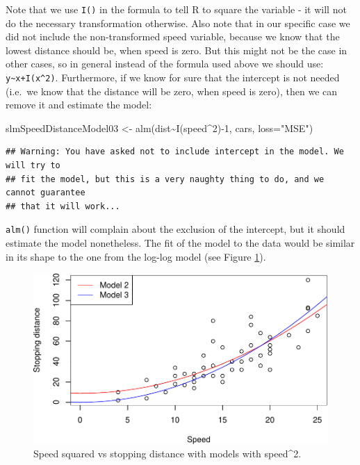 \documentclass[
]{book}
\newenvironment{Shaded}{\begin{snugshade}}{\end{snugshade}}
\newcommand{\AttributeTok}[1]{\textcolor[rgb]{0.77,0.63,0.00}{#1}}
\newcommand{\DecValTok}[1]{\textcolor[rgb]{0.00,0.00,0.81}{#1}}
\newcommand{\FunctionTok}[1]{\textcolor[rgb]{0.00,0.00,0.00}{#1}}
\newcommand{\NormalTok}[1]{#1}
\newcommand{\OtherTok}[1]{\textcolor[rgb]{0.56,0.35,0.01}{#1}}
\newcommand{\SpecialCharTok}[1]{\textcolor[rgb]{0.00,0.00,0.00}{#1}}
\newcommand{\StringTok}[1]{\textcolor[rgb]{0.31,0.60,0.02}{#1}}
\theoremstyle{definition}
\theoremstyle{definition}
\theoremstyle{definition}
\theoremstyle{definition}
\theoremstyle{remark}
\begin{document}
Note that we use \texttt{I()} in the formula to tell R to square the variable - it will not do the necessary transformation otherwise. Also note that in our specific case we did not include the non-transformed speed variable, because we know that the lowest distance should be, when speed is zero. But this might not be the case in other cases, so in general instead of the formula used above we should use: \texttt{y\textasciitilde{}x+I(x\^{}2)}. Furthermore, if we know for sure that the intercept is not needed (i.e.~we know that the distance will be zero, when speed is zero), then we can remove it and estimate the model:

\begin{Shaded}
\begin{Highlighting}[]
\NormalTok{slmSpeedDistanceModel03 }\OtherTok{\textless{}{-}} \FunctionTok{alm}\NormalTok{(dist}\SpecialCharTok{\textasciitilde{}}\FunctionTok{I}\NormalTok{(speed}\SpecialCharTok{\^{}}\DecValTok{2}\NormalTok{)}\SpecialCharTok{{-}}\DecValTok{1}\NormalTok{, cars, }\AttributeTok{loss=}\StringTok{"MSE"}\NormalTok{)}
\end{Highlighting}
\end{Shaded}

\begin{verbatim}
## Warning: You have asked not to include intercept in the model. We will try to
## fit the model, but this is a very naughty thing to do, and we cannot guarantee
## that it will work...
\end{verbatim}

\texttt{alm()} function will complain about the exclusion of the intercept, but it should estimate the model nonetheless. The fit of the model to the data would be similar in its shape to the one from the log-log model (see Figure \ref{fig:speedDistanceSquare02}).

\begin{figure}
\centering
\includegraphics{Svetunkov---Statistics-for-Business-Analytics_files/figure-latex/speedDistanceSquare02-1.pdf}
\caption{\label{fig:speedDistanceSquare02}Speed squared vs stopping distance with models with speed\^{}2.}
\end{figure}
\end{document}
